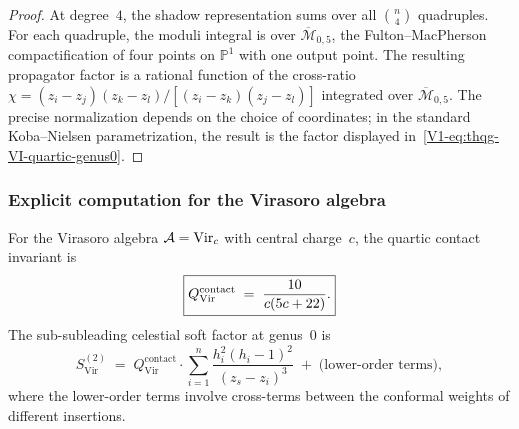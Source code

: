\begin{proof}
At degree~$4$, the shadow representation sums over all
$\binom{n}{4}$ quadruples. For each quadruple, the moduli
integral is over $\overline{\mathcal{M}}_{0,5}$, the
Fulton--MacPherson compactification of four points on
$\mathbb{P}^1$ with one output point. The resulting propagator
factor is a rational function of the cross-ratio
$\chi = (z_i - z_j)(z_k - z_l)/[(z_i - z_k)(z_j - z_l)]$
integrated over $\overline{\mathcal{M}}_{0,5}$. The precise
normalization depends on the choice of coordinates;
in the standard Koba--Nielsen parametrization, the result is the
factor displayed in~\eqref{V1-eq:thqg-VI-quartic-genus0}.
\end{proof}

\subsubsection{Explicit computation for the Virasoro algebra}

\begin{theorem}
For the Virasoro algebra $\mathcal{A} = \mathrm{Vir}_c$ with central
charge~$c$, the quartic contact invariant is
\begin{equation}%
\boxed{%
Q^{\mathrm{contact}}_{\mathrm{Vir}}
\;=\;
\frac{10}{c(5c + 22)}.}
\end{equation}
The sub-subleading celestial soft factor at genus~$0$ is
\begin{equation}%
S^{(2)}_{\mathrm{Vir}}
\;=\;
Q^{\mathrm{contact}}_{\mathrm{Vir}}
\cdot
\sum_{i=1}^{n}
\frac{h_i^2(h_i - 1)^2}{(z_s - z_i)^3}\;
+\; \text{(lower-order terms)},
\end{equation}
where the lower-order terms involve cross-terms between the
conformal weights of different insertions.
\end{theorem}

